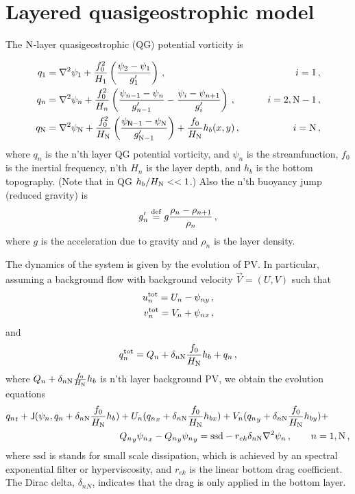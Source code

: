 \documentclass[11pt]{article}
\newcommand{\ssd}{\text{ssd}}
\newcommand{\tot}{\text{tot}}
\begin{document}


\section*{Layered quasigeostrophic model}

The $\mathrm{N}$-layer quasigeostrophic (QG) potential vorticity is

\begin{align}
{q_1} &= \nabla^2\psi_1 + \frac{f_0^2}{H_1} \left(\frac{\psi_{2}-\psi_1}{g'_{1}}\right)\,,  \qquad & i =1\, , \nonumber \\
{q_n} &= \nabla^2\psi_n + \frac{f_0^2}{H_n} \left(\frac{\psi_{n-1}-\psi_n}{g'_{n-1}}  - \frac{\psi_{i}-\psi_{n+1}}{g'_{i}}\right)\,,  \qquad &i = 2,\mathrm{N}-1 \, , \nonumber \\
{q_{\mathrm{N}}} &= \nabla^2\psi_{\mathrm{N}} + \frac{f_0^2}{H_{\mathrm{N}}} \left(\frac{\psi_{\textsf{N}-1}-\psi_{\mathrm{N}}}{g'_{\mathrm{N}-1}}\right) + \frac{f_0}{H_{\mathrm{N}}}h_b (x,y)\,,  \qquad & i =\mathrm{N}\,,
\end{align}
where $q_n$ is the n'th layer QG potential vorticity, and $\psi_n$ is the streamfunction, 
 $f_0$ is the inertial frequency, n'th $H_n$ is the layer depth, and $h_b$ is the 
bottom topography. (Note that in QG $h_b/H_{\mathrm{N}} << 1$.) Also the n'th buoyancy
jump (reduced gravity) is
\begin{equation}
g'_n \stackrel{\mathrm{def}}{=} g \frac{\rho_{n}-\rho_{n+1}}{\rho_n}\, ,
\end{equation}
where $g$ is the acceleration due to gravity and $\rho_n$ is the layer density.

The dynamics of the system is given by the evolution of PV. In particular, assuming a background
flow with background velocity $\vec{V} = (U,V)$ such that
\begin{align}
\label{eq:Udefn}
u_n^{{\tot}} = U_n - \psi_{n y}\com \nonumber \\
v_n^{\tot} = V_n + \psi_{n x} \com
\end{align}
and
\begin{equation}
q_n^{\tot} = Q_n + \delta_{n\nmax}\frac{f_0}{H_\nmax}h_b + q_n \com
\end{equation}
where $Q_n + \delta_{n\mathrm{N}}\frac{f_0}{H_{\mathrm{N}}}h_b$ is n'th layer background PV,
we obtain the evolution equations
\begin{align}
\label{eq:qg_dynamics}
{q_n}_t + \mathsf{J}(\psi_n,q_n + \delta_{n \nmax} \frac{f_0}{H_\nmax}h_b )& + U_n ({q_n}_x + \delta_{n \nmax} \frac{f_0}{H_\nmax}h_{bx}) + V_n ({q_n}_y + \delta_{n \nmax} \frac{f_0}{H_\nmax}h_{by})+ \nonumber
\\ & {Q_n}_y {\psi_n}_x - {Q_n}_y {\psi_n}_y = \ssd
- r_{ek} \delta_{n\nmax} \lap \psi_n \com \qquad n = 1,\nmax\com
\end{align}
where $\ssd$ is 
stands for small scale dissipation, which is achieved by an spectral exponential filter
or hyperviscosity, and $r_{ek}$ is the linear bottom drag coefficient. The Dirac delta,
$\delta_{nN}$, indicates that the drag is only applied in the bottom layer.
\end{document}
